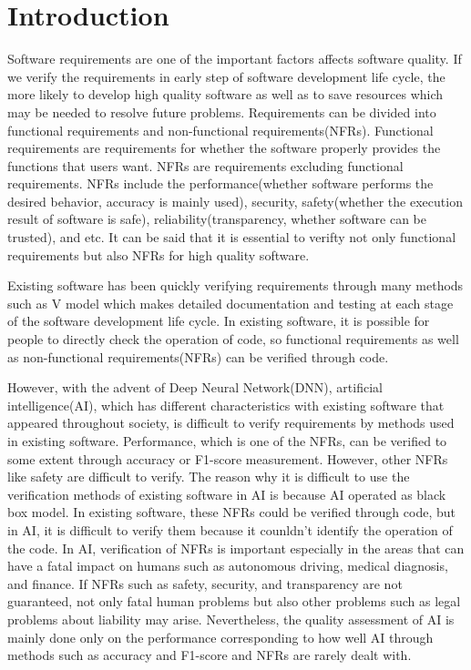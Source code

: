 \documentclass[journal,article,submit,moreauthors,pdftex]{Definitions/mdpi}
\begin{document}
\section{Introduction}

Software requirements are one of the important factors affects software quality.
If we verify the requirements in early step of software development life cycle, the more likely to develop high quality software as well as to save resources which may be needed to resolve future problems.
Requirements can be divided into functional requirements and non-functional requirements(NFRs).
Functional requirements are requirements for whether the software properly provides the functions that users want.
NFRs are requirements excluding functional requirements. NFRs include the performance(whether software performs the desired behavior, accuracy is mainly used), security\cite{security-mei,security-mei2,security-barreno}, safety(whether the execution result of software is safe)\cite{safety-amodei}, reliability(transparency, whether software can be trusted)\cite{transparency-yosinski, }, and etc. %
It can be said that it is essential to verifty not only functional requirements but also NFRs for high quality software.

Existing software has been quickly verifying requirements through many methods such as V model which makes detailed documentation and testing at each stage of the software development life cycle.
In existing software, it is possible for people to directly check the operation of code, so functional requirements as well as non-functional requirements(NFRs) can be verified through code.

However, with the advent of Deep Neural Network(DNN), artificial intelligence(AI), which has different characteristics with existing software that appeared throughout society, is difficult to verify requirements by methods used in existing software.
Performance, which is one of the NFRs, can be verified to some extent through accuracy or F1-score measurement. However, other NFRs like safety are difficult to verify.
The reason why it is difficult to use the verification methods of existing software in AI is because AI operated as black box model. In existing software, these NFRs could be verified through code, but in AI, it is difficult to verify them because it counldn't identify the operation of the code.
In AI, verification of NFRs is important especially in the areas that can have a fatal impact on humans such as autonomous driving, medical diagnosis, and finance.
If NFRs such as safety, security, and transparency are not guaranteed, not only fatal human problems but also other problems such as legal problems about liability may arise.
Nevertheless, the quality assessment of AI is mainly done only on the performance corresponding to how well AI through methods such as accuracy and F1-score and NFRs are rarely dealt with.
\end{document}
